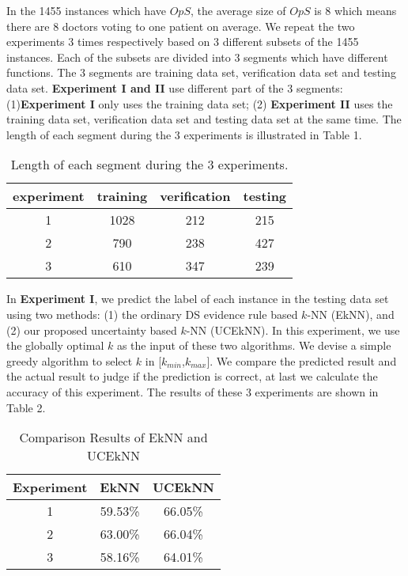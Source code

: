 \documentclass[runningheads]{llncs}
\begin{document}
In the 1455 instances which have $OpS$, the average size of $OpS$ is 8 which means there are 8 doctors voting to one patient on average. We repeat the two experiments 3 times respectively based on 3 different subsets of the 1455 instances. Each of the subsets are divided into 3 segments which have different functions. The 3 segments are training data set, verification data set and testing data set. \textbf{Experiment I and II} use different part of the 3 segments: (1)\textbf{Experiment I} only uses the training data set; (2) \textbf{Experiment II} uses the training data set, verification data set and testing data set at the same time. The length of each segment during the 3 experiments is illustrated in Table 1.
\begin{table}
\begin{center}
\caption{Length of each segment during the 3 experiments.}\label{tab1}
\begin{tabular}{|c|c|c|c|}
\hline
experiment &  training & verification & testing\\
\hline
1 & 1028 & 212 & 215\\
2 & 790 & 238 & 427\\
3 & 610 & 347 & 239\\
\hline
\end{tabular}    
\end{center}
\end{table}

In  \textbf{Experiment I}, we predict the label of each instance in the testing data set using two methods: (1) the ordinary DS evidence rule based $k$-NN (EkNN), and (2) our proposed uncertainty based $k$-NN (UCEkNN). In this experiment, we use the globally optimal $k$ as the input of these two algorithms. We devise a simple greedy algorithm to select $k$ in [$k_{min}$,$k_{max}$]. We compare the predicted result and the actual result to judge if the prediction is correct, at last we calculate the accuracy of this experiment. The results of these 3 experiments are shown in Table 2.

\begin{table}
\begin{center}
\caption{Comparison Results of EkNN and UCEkNN }\label{tab1}
\begin{tabular}{|c|c|c|}
\hline
Experiment &  EkNN & UCEkNN\\
\hline
1 & 59.53\% & 66.05\%\\
2 & 63.00\% & 66.04\% \\
3 & 58.16\% & 64.01\%\\
\hline
\end{tabular}    
\end{center}
\end{table}
\end{document}
